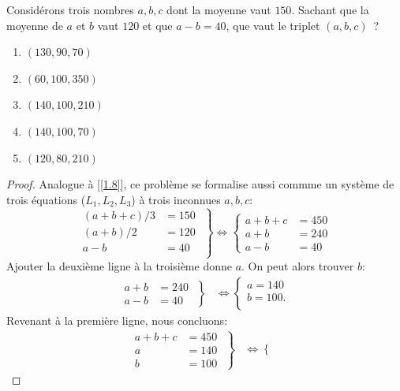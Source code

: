 %
\noindent%
Considérons trois nombres $a, b, c$ dont la moyenne vaut $150$. Sachant que la
moyenne de $a$ et $b$ vaut $120$ et que $a - b = 40$, que vaut le triplet
$(a, b, c)$~?
\begin{enumerate}
  \item $(130,90,70)$
  \item $(60,100,350)$
  \item $(140,100,210)$
  \item $(140,100,70)$
  \item $(120,80,210)$
\end{enumerate}
%
%
\begin{proof}
Analogue à [\ref{1.8}], ce problème se formalise aussi commme un système de trois équations ($L_1, L_2, L_3$) à trois %
inconnues $a, b, c$: 
%
\begin{equation}
  \left.
  \begin{aligned}
    (a+b+c)/3 &= 150\,\, \\
    (a+b)/2   &= 120 \\
    a - b           &= 40 \\
  \end{aligned}
  \right\} \iff
  \begin{cases} \label{1.9:equations}
    a+b+c &= 450 \\
    a+b   &= 240 \\
    a - b &= 40 
  \end{cases}
\end{equation}
%
Ajouter la deuxième ligne à la troisième donne $a$. On peut alors trouver $b$:
%
\begin{align}
  \left.
  \begin{aligned}
    a+b   &= 240\,\, \\
    a - b &= 40 
  \end{aligned}
  \right\} & \iff 
  \begin{cases}
    a = 140 \\
    b = 100. \\
  \end{cases}
\end{align}
%
Revenant à la première ligne, nous concluons:
%
\begin{align}
  \left.
  \begin{aligned}
    a + b + c &= 450\,\, \\
    a &= 140 \\
    b &= 100
  \end{aligned}
  \right\} & \iff
  \left\{
  \begin{aligned}

\end{aligned}
\end{align}
\end{proof}
